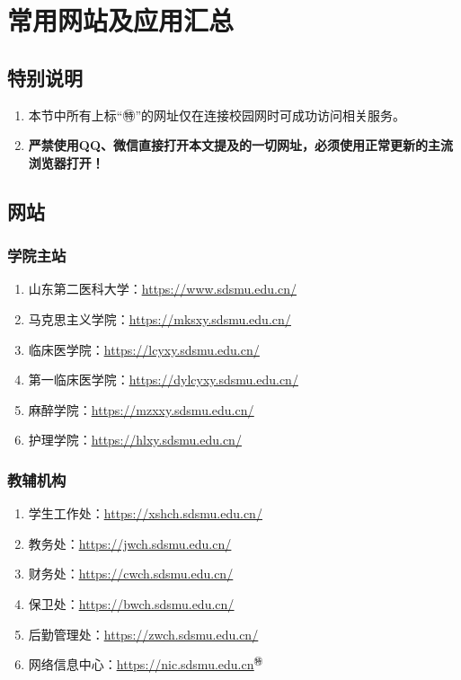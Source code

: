 \chapter[常用网站及应用汇总]{常用网站及应用汇总}

\section*{特别说明}
\begin{enumerate}
    \item 本节中所有上标“㊕”的网址仅在连接校园网时可成功访问相关服务。
    \item \textbf{严禁使用QQ、微信直接打开本文提及的一切网址，必须使用正常更新的主流浏览器打开！}
\end{enumerate}

\section[网站]{网站}
\subsection[学院主站]{学院主站}
\begin{enumerate}
    \item 山东第二医科大学：\uline{\href{https://www.sdsmu.edu.cn/}{https://www.sdsmu.edu.cn/}}
    \item 马克思主义学院：\uline{\href{https://mksxy.sdsmu.edu.cn/}{https://mksxy.sdsmu.edu.cn/}}
    \item 临床医学院：\uline{\href{https://lcyxy.sdsmu.edu.cn/}{https://lcyxy.sdsmu.edu.cn/}}
    \item 第一临床医学院：\uline{\href{https://dylcyxy.sdsmu.edu.cn/}{https://dylcyxy.sdsmu.edu.cn/}}
    \item 麻醉学院：\uline{\href{https://mzxxy.sdsmu.edu.cn/}{https://mzxxy.sdsmu.edu.cn/}}
    \item 护理学院：\uline{\href{https://hlxy.sdsmu.edu.cn/}{https://hlxy.sdsmu.edu.cn/}}
\end{enumerate}

\subsection[教辅机构]{教辅机构}
\begin{enumerate}
    \item 学生工作处：\uline{\href{https://xshch.sdsmu.edu.cn/}{https://xshch.sdsmu.edu.cn/}}
    \item 教务处：\uline{\href{https://jwch.sdsmu.edu.cn/}{https://jwch.sdsmu.edu.cn/}}
    \item 财务处：\uline{\href{https://cwch.sdsmu.edu.cn/}{https://cwch.sdsmu.edu.cn/}}
    \item 保卫处：\uline{\href{https://bwch.sdsmu.edu.cn/}{https://bwch.sdsmu.edu.cn/}}
    \item 后勤管理处：\uline{\href{https://zwch.sdsmu.edu.cn/}{https://zwch.sdsmu.edu.cn/}}
    \item 网络信息中心：\uline{\href{https://nic.sdsmu.edu.cn}{https://nic.sdsmu.edu.cn}$^㊕$}
\end{enumerate}

